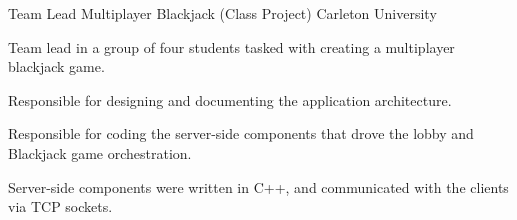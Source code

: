 


\begin{cventries}


\cventry
{Team Lead} %
{Multiplayer Blackjack (Class Project)} %
{Carleton University} %
{} %
{ %
\begin{cvitems}
  \item {Team lead in a group of four students tasked with creating a multiplayer blackjack game.}
  \item {Responsible for designing and documenting the application architecture.}
  \item {Responsible for coding the server-side components that drove the lobby and Blackjack game orchestration.}
  \item {Server-side components were written in C++, and communicated with the clients via TCP sockets.}
\end{cvitems}
}


\end{cventries}